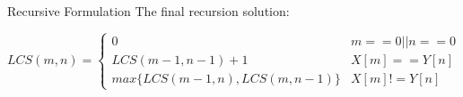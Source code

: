 \begin{frame}{Recursive Formulation}
    \large The final recursion solution:
       
        \small{
            \[  LCS(m,n) = 
                \begin{cases}
                  0 & m == 0 || n == 0\\
                  LCS(m-1 , n-1)+1 & X[m] == Y[n] \\
                  max\{LCS(m-1 ,n),LCS(m,n-1)\}  & X[m] != Y[n]
               \end{cases}
            \]
        }
\end{frame}

